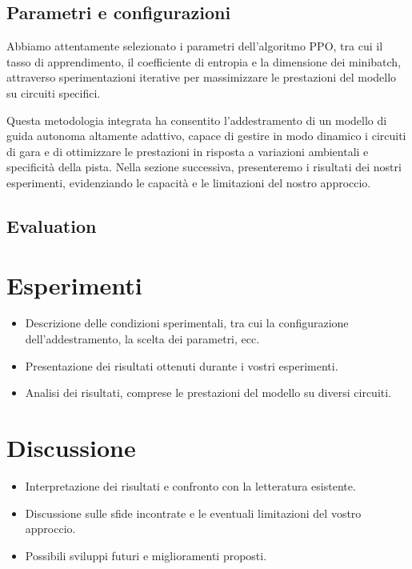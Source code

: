 \documentclass[conference]{IEEEtran}
\begin{document}
\subsection{Parametri e configurazioni}
Abbiamo attentamente selezionato i parametri dell'algoritmo PPO, tra cui il tasso di apprendimento, il coefficiente di entropia e la dimensione dei minibatch, attraverso sperimentazioni iterative per massimizzare le prestazioni del modello su circuiti specifici.

\medskip

Questa metodologia integrata ha consentito l'addestramento di un modello di guida autonoma altamente adattivo, capace di gestire in modo dinamico i circuiti di gara e di ottimizzare le prestazioni in risposta a variazioni ambientali e specificità della pista. Nella sezione successiva, presenteremo i risultati dei nostri esperimenti, evidenziando le capacità e le limitazioni del nostro approccio.

%
%
%
\subsection{Evaluation}

\section{Esperimenti}

\begin{itemize}
    \item Descrizione delle condizioni sperimentali, tra cui la configurazione dell'addestramento, la scelta dei parametri, ecc.

    \item Presentazione dei risultati ottenuti durante i vostri esperimenti.

    \item Analisi dei risultati, comprese le prestazioni del modello su diversi circuiti.

\end{itemize}

\section{Discussione}

\begin{itemize}
    \item Interpretazione dei risultati e confronto con la letteratura esistente.

    \item Discussione sulle sfide incontrate e le eventuali limitazioni del vostro approccio.

    \item Possibili sviluppi futuri e miglioramenti proposti.

\end{itemize}
\end{document}
